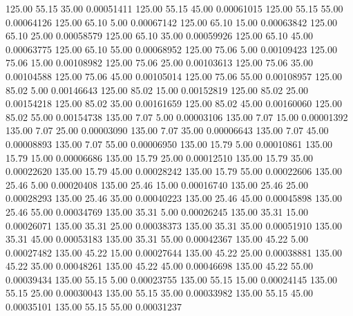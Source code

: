     125.00     55.15     35.00     0.00051411
    125.00     55.15     45.00     0.00061015
    125.00     55.15     55.00     0.00064126
    125.00     65.10      5.00     0.00067142
    125.00     65.10     15.00     0.00063842
    125.00     65.10     25.00     0.00058579
    125.00     65.10     35.00     0.00059926
    125.00     65.10     45.00     0.00063775
    125.00     65.10     55.00     0.00068952
    125.00     75.06      5.00     0.00109423
    125.00     75.06     15.00     0.00108982
    125.00     75.06     25.00     0.00103613
    125.00     75.06     35.00     0.00104588
    125.00     75.06     45.00     0.00105014
    125.00     75.06     55.00     0.00108957
    125.00     85.02      5.00     0.00146643
    125.00     85.02     15.00     0.00152819
    125.00     85.02     25.00     0.00154218
    125.00     85.02     35.00     0.00161659
    125.00     85.02     45.00     0.00160060
    125.00     85.02     55.00     0.00154738
    135.00      7.07      5.00     0.00003106
    135.00      7.07     15.00     0.00001392
    135.00      7.07     25.00     0.00003090
    135.00      7.07     35.00     0.00006643
    135.00      7.07     45.00     0.00008893
    135.00      7.07     55.00     0.00006950
    135.00     15.79      5.00     0.00010861
    135.00     15.79     15.00     0.00006686
    135.00     15.79     25.00     0.00012510
    135.00     15.79     35.00     0.00022620
    135.00     15.79     45.00     0.00028242
    135.00     15.79     55.00     0.00022606
    135.00     25.46      5.00     0.00020408
    135.00     25.46     15.00     0.00016740
    135.00     25.46     25.00     0.00028293
    135.00     25.46     35.00     0.00040223
    135.00     25.46     45.00     0.00045898
    135.00     25.46     55.00     0.00034769
    135.00     35.31      5.00     0.00026245
    135.00     35.31     15.00     0.00026071
    135.00     35.31     25.00     0.00038373
    135.00     35.31     35.00     0.00051910
    135.00     35.31     45.00     0.00053183
    135.00     35.31     55.00     0.00042367
    135.00     45.22      5.00     0.00027482
    135.00     45.22     15.00     0.00027644
    135.00     45.22     25.00     0.00038881
    135.00     45.22     35.00     0.00048261
    135.00     45.22     45.00     0.00046698
    135.00     45.22     55.00     0.00039434
    135.00     55.15      5.00     0.00023755
    135.00     55.15     15.00     0.00024145
    135.00     55.15     25.00     0.00030043
    135.00     55.15     35.00     0.00033982
    135.00     55.15     45.00     0.00035101
    135.00     55.15     55.00     0.00031237
